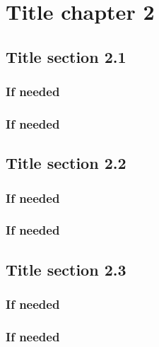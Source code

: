 \chapter{Title chapter 2}
\label{ch2}

\begin{spacing}{1} 
\minitoc 
\end{spacing} 
\doublespacing 




\section{Title section 2.1}



\subsection{If needed}



\subsection{If needed}



\section{Title section 2.2}

\subsection{If needed}


\subsection{If needed}


\section{Title section 2.3}


\subsection{If needed}



\subsection{If needed}


